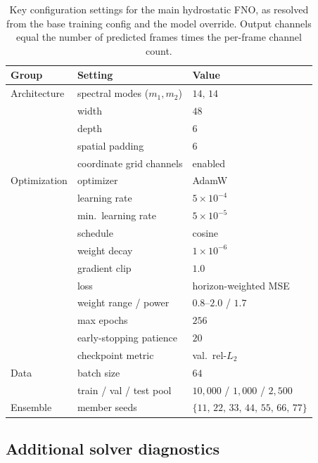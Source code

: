 \begin{table}[H]
\centering
\caption{Key configuration settings for the main hydrostatic FNO, as resolved from the base training config and the model override. Output channels equal the number of predicted frames times the per-frame channel count.}
\label{tab:app-config}
\begin{tabular}{lll}
    \toprule
    Group & Setting & Value \\
    \midrule
    Architecture & spectral modes ($m_1, m_2$) & $14,\, 14$ \\
                 & width & $48$ \\
                 & depth & $6$  \\
                 & spatial padding & $6$ \\
                 & coordinate grid channels  & enabled \\
    \midrule
    Optimization & optimizer & AdamW \\
                 & learning rate & $5 \times 10 ^ {-4}$ \\
                 & min.\ learning rate & $5 \times 10 ^ {-5}$ \\
                 & schedule & cosine \\
                 & weight decay & $1 \times 10 ^ {-6}$ \\
                 & gradient clip & $1.0$ \\
                 & loss & horizon-weighted MSE \\
                 & weight range / power & $0.8$--$2.0$ / $1.7$ \\
                 & max epochs & $256$ \\
                 & early-stopping patience & $20$ \\
                 & checkpoint metric & val.\ rel-$L_2$ \\
    \midrule
    Data         & batch size & $64$ \\
                 & train / val / test pool & $10{,}000$ / $1{,}000$ / $2{,}500$ \\
    \midrule
    Ensemble     & member seeds & $\{11,\,22,\,33,\,44,\,55,\,66,\,77\}$ \\
    \bottomrule
\end{tabular}
\end{table}

\subsection{Additional solver diagnostics}
\label{app:solver-diag}

